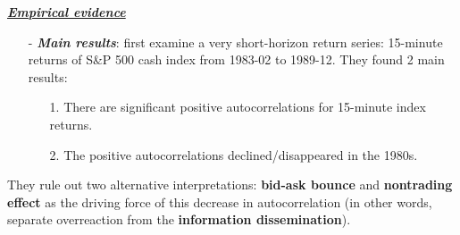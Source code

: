  \noindent \underline{\textit{\textbf{Empirical evidence}}}
     
\begin{enumerate}
    \item[-] \textbf{\textit{Main results}}:
    \citet{froot1995new} first examine a very short-horizon return series: 15-minute returns of S\&P 500 cash index from 1983-02 to 1989-12. They found 2 main results:
    \begin{enumerate}
        \item[1.] There are significant positive autocorrelations for 15-minute index returns.
        \item[2.] The positive autocorrelations declined/disappeared in the 1980s. 
    \end{enumerate}
\end{enumerate}

\noindent They rule out two alternative interpretations: \textbf{bid-ask bounce} and \textbf{nontrading effect} as the driving force of this decrease in autocorrelation (in other words, separate overreaction from the 
\textbf{information dissemination}).

